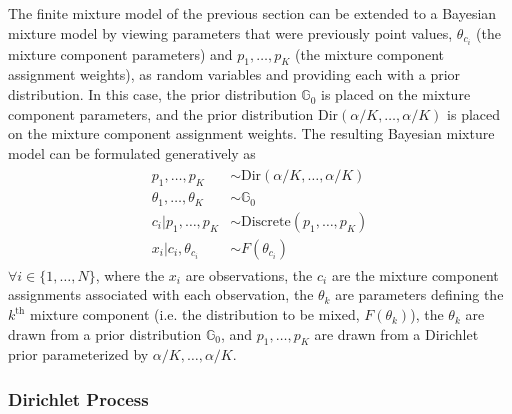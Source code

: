 \documentclass[smallcondensed, final]{svjour3}
\begin{document}
The finite mixture model of the previous section can be extended to a Bayesian mixture model by viewing parameters that were previously point values, $\theta_{c_{i}}$ (the mixture component parameters) and $p_{1}, \ldots, p_{K}$ (the mixture component assignment weights), as random variables and providing each with a prior distribution. In this case, the prior distribution $\mathbb{G}_{0}$ is placed on the mixture component parameters, and the prior distribution $\text{Dir}(\alpha/K, \ldots, \alpha/K)$ is placed on the mixture component assignment weights. The resulting Bayesian mixture model can be formulated generatively as
\begin{align}
\begin{split}
\label{bayesian_mixture_model}
	p_{1}, \ldots, p_{K}  &\sim  \text{Dir}(\alpha/K, \ldots, \alpha/K)\\
	\theta_{1}, \ldots, \theta_{K}  &\sim  \mathbb{G}_{0} \\
	c_{i}|p_{1}, \ldots, p_{K}  &\sim  \text{Discrete}(p_{1}, \ldots, p_{K}) \\
	x_{i}|c_{i}, \theta_{c_{i}}  &\sim  F(\theta_{c_{i}})
\end{split}
\end{align}
$\forall i \in \{ 1, \ldots, N \}$, where the $x_{i}$ are observations, the $c_{i}$ are the mixture component assignments associated with each observation, the $\theta_{k}$ are parameters defining the $k^{\text{th}}$ mixture component (i.e. the distribution to be mixed, $F(\theta_{k})$), the $\theta_{k}$ are drawn from a prior distribution $\mathbb{G}_{0}$, and $p_{1}, \ldots, p_{K}$ are drawn from a Dirichlet prior parameterized by $\alpha/K, \ldots, \alpha/K$.






\subsubsection{Dirichlet Process}
\label{sec:dirichlet_process}

\end{document}
